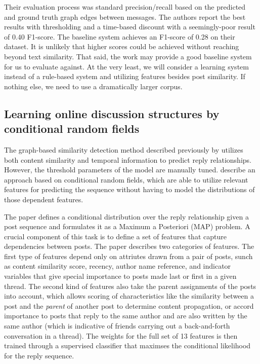 \documentclass{article}
\begin{document}
Their evaluation process was standard precision/recall based on the predicted
and ground truth graph edges between messages. The authors report the best
results with thresholding and a time-based discount with a seemingly-poor result of 0.40 
F1-score. The baseline system achieves an F1-score of 0.28 on their
dataset. It is unlikely that higher scores could be achieved without reaching
beyond text similarity. That said, the work may provide a good baseline system for us to evaluate against. 
At the very least, we will consider a learning system instead of a rule-based system 
and utilizing features besides post similarity.
If nothing else, we need to use a dramatically larger corpus.

\subsection{Learning online discussion structures by conditional random fields}
The graph-based similarity detection method described previously by \cite{Wang2008a} utilizes both content similarity and temporal information to predict reply relationships. However, the threshold parameters of the model are manually tuned. \cite{Wang2011} describe an approach based on conditional random fields, which are able to utilize relevant features for predicting the sequence without having to model the distributions of those dependent features.

The \cite{Wang2011} paper defines a conditional distribution over the reply relationship given a post sequence and formulates it as a Maximum a Posteriori (MAP) problem. A crucial component of this task is to define a set of features that capture dependencies between posts. The paper describes two categories of features. The first type of features depend only on attriutes drawn from a pair of posts, sunch as content similarity score, recency, author name reference, and indicator variables that give special importance to posts made last or first in a given thread. The second kind of features also take the parent assignments of the posts into account, which allows scoring of characteristics like the similarity between a post and the \emph{parent} of another post to determine content propagation, or accord importance to posts that reply to the same author and are also written by the same author (which is indicative of friends carrying out a back-and-forth conversation in a thread). The weights for the full set of 13 features is then trained through a supervised classifier that maximses the conditional likelihood for the reply sequence.
\end{document}
